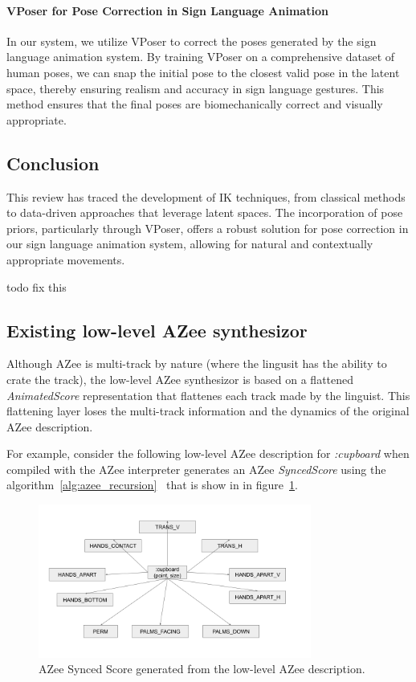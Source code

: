 \documentclass[../../main.tex]{subfiles}
\begin{document}
\paragraph{VPoser for Pose Correction in Sign Language Animation} In our system, we utilize VPoser to correct the poses generated by the sign language animation system. By training VPoser on a comprehensive dataset of human poses, we can snap the initial pose to the closest valid pose in the latent space, thereby ensuring realism and accuracy in sign language gestures. This method ensures that the final poses are biomechanically correct and visually appropriate.

\subsection{Conclusion}
\label{ch:pose_correction:related_work:conclusion}
This review has traced the development of IK techniques, from classical methods to data-driven approaches that leverage latent spaces. The incorporation of pose priors, particularly through VPoser, offers a robust solution for pose correction in our sign language animation system, allowing for natural and contextually appropriate movements.


todo fix this

\subsection{Existing low-level AZee synthesizor}
\label{ch:multi_track:related_work:old_azee_synthesizor}

Although AZee is multi-track by nature (where the lingusit has the ability to crate the track), the low-level AZee synthesizor is based on a flattened \emph{AnimatedScore} representation that flattenes each track made by the linguist. This flattening layer loses the multi-track information and the dynamics of the original AZee description. 

For example, consider the following low-level AZee description for \emph{:cupboard} when compiled with the AZee interpreter generates an AZee \emph{SyncedScore} using the algorithm~\ref{alg:azee_recursion}~\cite{filhol2017synthesizing} that is show in in figure~\ref{fig:azee_synced_score}.

\begin{figure}[h]
    \centering
    \includegraphics[width=0.8\textwidth]{chapters/multi_track/images/azee_synced_score.png}
    \caption{AZee Synced Score generated from the low-level AZee description.}
    \label{fig:azee_synced_score}
\end{figure}
\end{document}
